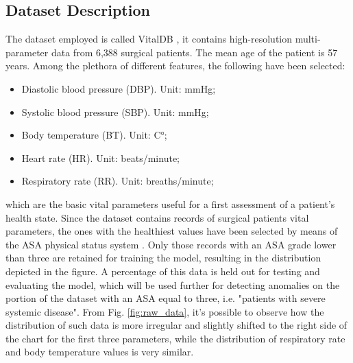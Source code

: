 \documentclass{article}
\begin{document}
\begin{multicols*}{2}
\section{Dataset Description}
	\label{dataset}
The dataset employed is called VitalDB \cite{VitalDB}, it contains high-resolution multi-parameter data from 6,388 surgical patients. The mean age of the patient is 57 years. Among the plethora of different features, the following have been selected:
\begin{itemize}
	\setlength\itemsep{-0.1em}
			\item Diastolic blood pressure (DBP). Unit: mmHg;
			\item Systolic blood pressure (SBP). Unit: mmHg;
			\item Body temperature (BT). Unit: C°;
			\item Heart rate (HR). Unit: beats/minute;
			\item Respiratory rate (RR). Unit: breaths/minute;
\end{itemize}
which are the basic vital parameters useful for a first assessment of a patient's health state. Since the dataset contains records of surgical patients vital parameters, the ones with the healthiest values have been selected by means of the ASA physical status system  \cite{ASA}. Only those records with an ASA grade lower than three are retained for training the model, resulting in the distribution depicted in the figure. A percentage of this data is held out for testing and evaluating the model, which will be used further for detecting anomalies on the portion of the dataset with an ASA equal to three, i.e. "patients with severe systemic disease". From Fig. \ref{fig:raw_data}, it's possible to observe how the distribution of such data is more irregular and slightly shifted to the right side of the chart for the first three parameters, while the distribution of respiratory rate and body temperature values is very similar.


\end{multicols*}
\end{document}
